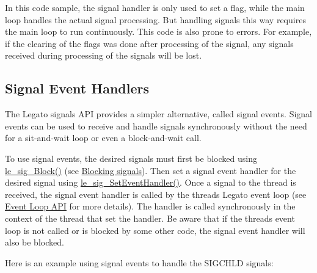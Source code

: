 In this code sample, the signal handler is only used to set a flag, while the main loop handles the actual signal processing. But handling signals this way requires the main loop to run continuously. This code is also prone to errors. For example, if the clearing of the flags was done after processing of the signal, any signals received during processing of the signals will be lost.\hypertarget{c_signals_c_signals_eventHandlers}{}\subsection{Signal Event Handlers}\label{c_signals_c_signals_eventHandlers}
The Legato signals A\+P\+I provides a simpler alternative, called signal events. Signal events can be used to receive and handle signals synchronously without the need for a sit-\/and-\/wait loop or even a block-\/and-\/wait call.

To use signal events, the desired signals must first be blocked using \hyperlink{le__signals_8h_a095ec12deab6b6ed0475583586a6c4d7}{le\+\_\+sig\+\_\+\+Block()} (see \hyperlink{c_signals_c_signals_blocking}{Blocking signals}). Then set a signal event handler for the desired signal using {\ttfamily \hyperlink{le__signals_8h_a421910132f193dae70e8309dc86a86c4}{le\+\_\+sig\+\_\+\+Set\+Event\+Handler()}}. Once a signal to the thread is received, the signal event handler is called by the thread\textquotesingle{}s Legato event loop (see \hyperlink{c_eventLoop}{Event Loop A\+P\+I} for more details). The handler is called synchronously in the context of the thread that set the handler. Be aware that if the thread\textquotesingle{}s event loop is not called or is blocked by some other code, the signal event handler will also be blocked.

Here is an example using signal events to handle the S\+I\+G\+C\+H\+L\+D signals\+:


